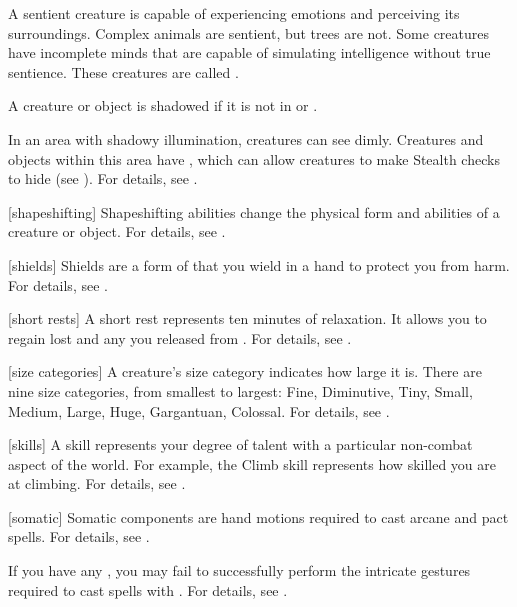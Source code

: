  A sentient creature is capable of experiencing emotions and perceiving its surroundings.
Complex animals are sentient, but trees are not.
Some creatures have incomplete minds that are capable of simulating intelligence without true sentience.
These creatures are called .

 A creature or object is shadowed if it is not in  or .

 In an area with shadowy illumination, creatures can see dimly.
Creatures and objects within this area have , which can allow creatures to make Stealth checks to hide (see ).
For details, see .

[shapeshifting] Shapeshifting abilities change the physical form and abilities of a creature or object.
For details, see .

[shields] Shields are a form of  that you wield in a hand to protect you from harm.
For details, see .

[short rests] A short rest represents ten minutes of relaxation.
It allows you to regain lost  and any  you released from .
For details, see .

[size categories] A creature's size category indicates how large it is.
There are nine size categories, from smallest to largest: Fine, Diminutive, Tiny, Small, Medium, Large, Huge, Gargantuan, Colossal.
For details, see .

[skills] A skill represents your degree of talent with a particular non-combat aspect of the world.
For example, the Climb skill represents how skilled you are at climbing.
For details, see .

[somatic] Somatic components are hand motions required to cast arcane and pact spells.
For details, see .

 If you have any , you may fail to successfully perform the intricate gestures required to cast spells with .
For details, see .

